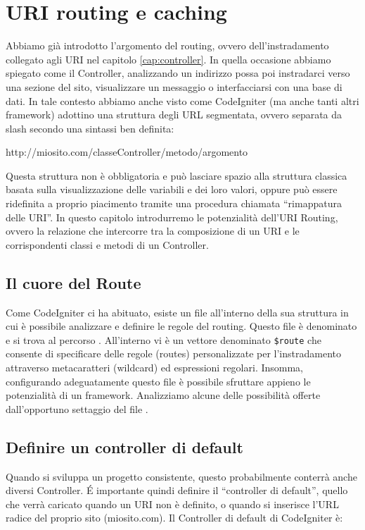 \chapter{URI routing e caching}
\label{cap:uri}

Abbiamo già introdotto l'argomento del routing, ovvero dell'instradamento collegato agli \ac{URI} nel capitolo \vref{cap:controller}. In quella occasione abbiamo spiegato come il Controller, analizzando un indirizzo possa poi instradarci verso una sezione del sito, visualizzare un messaggio o interfacciarsi con una base di dati. In tale contesto abbiamo anche visto come CodeIgniter (ma anche tanti altri framework) adottino una struttura degli \ac{URL} segmentata, ovvero separata da slash secondo una sintassi ben definita:

\begin{code}
http://miosito.com/classeController/metodo/argomento
\end{code}

Questa struttura non è obbligatoria e può lasciare spazio alla struttura classica basata sulla visualizzazione delle variabili e dei loro valori, oppure può essere ridefinita a proprio piacimento tramite una procedura chiamata ``rimappatura delle \ac{URI}''. In questo capitolo introdurremo le potenzialità dell'URI Routing, ovvero la relazione che intercorre tra la composizione di un \ac{URI} e le corrispondenti classi e metodi di un Controller.

\section*{Il cuore del Route}
Come CodeIgniter ci ha abituato, esiste un file all'interno della sua struttura in cui è possibile analizzare e definire le regole del routing. Questo file è denominato  e si trova al percorso . All'interno vi è un vettore denominato \verb|$route| che consente di specificare delle regole (routes) personalizzate per l'instradamento attraverso metacaratteri (wildcard) ed espressioni regolari. Insomma, configurando adeguatamente questo file è possibile sfruttare appieno le potenzialità di un framework. Analizziamo alcune delle possibilità offerte dall'opportuno settaggio del file .

\section*{Definire un controller di default}
Quando si sviluppa un progetto consistente, questo probabilmente conterrà anche diversi Controller. \'E importante quindi definire il ``controller di default'', quello che verrà caricato quando un \ac{URI} non è definito, o quando si inserisce l'\ac{URL} radice del proprio sito (miosito.com). Il Controller di default di CodeIgniter è:

